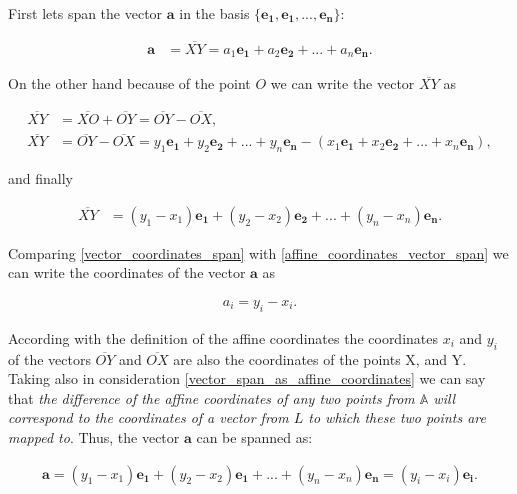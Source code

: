 \documentclass{book}
\begin{document}
First lets span the vector $\boldsymbol{a}$ in the basis $\{\boldsymbol{e_1}, \boldsymbol{e_1}, ..., \boldsymbol{e_n}\}$:

\begin{align}
\boldsymbol{a} &= \overline{XY} = a_1\boldsymbol{e_1} + a_2\boldsymbol{e_2} + ... + a_n\boldsymbol{e_n}. \label{affine_coordinates_vector_span}
\end{align}

On the other hand because of the point $O$ we can write the vector $\overline{XY}$ as

\begin{align*}
\overline{XY} &= \overline{XO} + \overline{OY} = \overline{OY} - \overline{OX}, \\
\overline{XY} &= \overline{OY} - \overline{OX} = y_1\boldsymbol{e_1} + y_2\boldsymbol{e_2} + ... + y_n\boldsymbol{e_n} - (x_1\boldsymbol{e_1} + x_2\boldsymbol{e_2} + ... + x_n\boldsymbol{e_n}),
\end{align*}

and finally

\begin{align}
\overline{XY} &= (y_1 - x_1)\boldsymbol{e_1} + (y_2 - x_2)\boldsymbol{e_2} + ... + (y_n - x_n)\boldsymbol{e_n}. \label{vector_coordinates_span}
\end{align}

Comparing \eqref{vector_coordinates_span}  with \eqref{affine_coordinates_vector_span} we can write the coordinates of the vector $\boldsymbol{a}$ as

\begin{align}
a_i = y_i - x_i. \label{vector_span_as_affine_coordinates}
\end{align}

According with the definition of the affine coordinates the coordinates $x_i$ and $y_i$ of the vectors $\overline{OY}$ and $\overline{OX}$ are also the coordinates of the points X, and Y. Taking also in consideration \eqref{vector_span_as_affine_coordinates} we can say that \emph{the difference of the affine coordinates of any two points from $\mathbb{A}$ will correspond to the coordinates of a vector from $L$ to which these two points are mapped to}. Thus, the vector $\boldsymbol{a}$ can be spanned as:

\begin{align}
\boldsymbol{a} = (y_1 - x_1)\boldsymbol{e_1} + (y_2 - x_2)\boldsymbol{e_1} + ... + (y_n - x_n)\boldsymbol{e_n} = (y_i - x_i)\boldsymbol{e_i}. \label{vector_span_affine_coordiantes}
\end{align}
\end{document}

